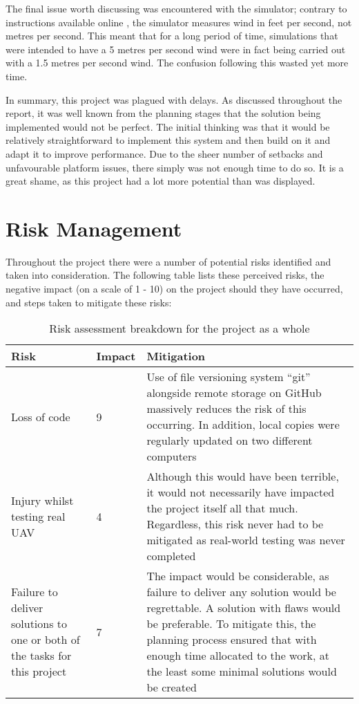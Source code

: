 The final issue worth discussing was encountered with the simulator; contrary to instructions available online \cite{ArduPilotSITL}, the simulator measures wind in feet per second, not metres per second. This meant that for a long period of time, simulations that were intended to have a 5 metres per second wind were in fact being carried out with a 1.5 metres per second wind. The confusion following this wasted yet more time.

In summary, this project was plagued with delays. As discussed throughout the report, it was well known from the planning stages that the solution being implemented would not be perfect. The initial thinking was that it would be relatively straightforward to implement this system and then build on it and adapt it to improve performance. Due to the sheer number of setbacks and unfavourable platform issues, there simply was not enough time to do so. It is a great shame, as this project had a lot more potential than was displayed.

\section{Risk Management}
\label{planning:risks}

Throughout the project there were a number of potential risks identified and taken into consideration. The following table lists these perceived risks, the negative impact (on a scale of 1 - 10) on the project should they have occurred, and steps taken to mitigate these risks: 

\begin{table}[h!]
\centering
\caption{Risk assessment breakdown for the project as a whole\label{tab:riskassessment}}
 \begin{tabular}{p{} | p{} | p{}}
	\hline
	\textbf{Risk} & \textbf{Impact} & \textbf{Mitigation} \\
	\hline
	\hline
	Loss of code & 9 & Use of file versioning system ``git'' alongside remote storage on GitHub massively reduces the risk of this occurring. In addition, local copies were regularly updated on two different computers \\
	\hline
	Injury whilst testing real UAV & 4 & Although this would have been terrible, it would not necessarily have impacted the project itself all that much. Regardless, this risk never had to be mitigated as real-world testing was never completed \\
	\hline
	Failure to deliver solutions to one or both of the tasks for this project & 7 & The impact would be considerable, as failure to deliver any solution would be regrettable. A solution with flaws would be preferable. To mitigate this, the planning process ensured that with enough time allocated to the work, at the least some minimal solutions would be created \\
	\hline
 \end{tabular}
\end{table}

